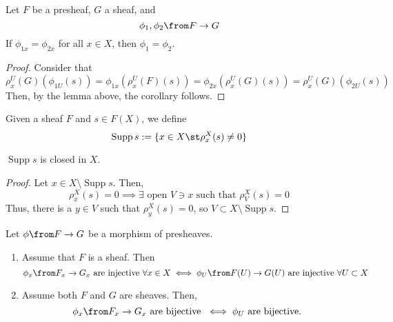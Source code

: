 \documentclass[11pt,leqno,oneside]{amsbook}
\renewcommand{\F}{F} %
\newcommand{\G}{G}
\DeclareMathOperator{\Supp}{Supp} %
\numberwithin{thm}{section}
\begin{document}
\begin{cor}
  Let \(\F\) be a presheaf, \(\G\) a sheaf, and \[
    \phi_1, \phi_2 \from \F \to \G
  \]
  If \(\phi_{1x} = \phi_{2x}\) for all \(x \in X\), then \(\phi_1 =
  \phi_2\). 
\end{cor}
\begin{proof}
  Consider that \[
    \rho^U_x(\G)(\phi_{1U}(s)) = \phi_{1x}(\rho_x^U(\F)(s)) =
    \phi_{2x}(\rho^U_x(\G)(s)) = \rho^U_x(\G)(\phi_{2U}(s))
  \]
  Then, by the lemma above, the corollary follows.
\end{proof}
\begin{defn}
  Given a sheaf \(\F\) and \(s \in \F(X)\), we define \[
    \Supp s := \{x \in X \st \rho^X_x(s) \neq 0\}
  \]
\end{defn}
\begin{prop}
  \(\Supp s\) is closed in \(X\).
\end{prop}
\begin{proof}
  Let \(x \in X \setminus \Supp s\). Then, \[
    \rho^X_x(s) = 0 \implies \exists \text{ open } V \ni x \text{ such that }
    \rho^X_V(s) = 0
  \]
  Thus, there is a \(y \in V\) such that \(\rho^X_y(s) = 0\), so \(V
  \subset X \setminus \Supp s\).
\end{proof}
\begin{prop}\label{inj-and-bij-lift-from-stalk}
  Let \(\phi \from \F \to \G\) be a morphism of presheaves.
  \begin{enumerate}
  \item Assume that \(\F\) is a sheaf. Then \[
      \phi_x \from \F_x \to \G_x \text{ are injective }\forall x \in X
      \iff \phi_U \from \F(U) \to \G(U) \text{ are injective }\forall
      U \subset X
    \]
  \item Assume both \(\F\) and \(\G\) are sheaves. Then, \[
      \phi_x \from \F_x \to \G_x \text{ are bijective }\iff \phi_U
      \text{ are bijective.}
    \]
  \end{enumerate}
\end{prop}
\end{document}
